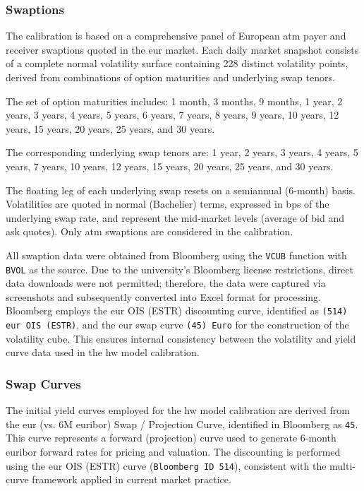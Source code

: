 \subsubsection{Swaptions}
The calibration is based on a comprehensive panel of European \ac{atm} payer and receiver swaptions quoted in the \ac{eur} market. Each daily market snapshot consists of a complete normal volatility surface containing 228 distinct volatility points, derived from combinations of option maturities and underlying swap tenors.

The set of option maturities includes:
1 month, 3 months, 9 months, 1 year, 2 years, 3 years, 4 years, 5 years, 6 years, 7 years, 8 years, 9 years, 10 years, 12 years, 15 years, 20 years, 25 years, and 30 years.

The corresponding underlying swap tenors are:
1 year, 2 years, 3 years, 4 years, 5 years, 7 years, 10 years, 12 years, 15 years, 20 years, 25 years, and 30 years.

The floating leg of each underlying swap resets on a semiannual (6-month) basis. Volatilities are quoted in normal (Bachelier) terms, expressed in \ac{bps} of the underlying swap rate, and represent the mid-market levels (average of bid and ask quotes). Only \ac{atm} swaptions are considered in the calibration.

All swaption data were obtained from Bloomberg using the \texttt{VCUB} function with \texttt{BVOL} as the source. Due to the university's Bloomberg license restrictions, direct data downloads were not permitted; therefore, the data were captured via screenshots and subsequently converted into Excel format for processing. Bloomberg employs the \ac{eur} OIS (ESTR) discounting curve, identified as \texttt{(514) \ac{eur} OIS (ESTR)}, and the \ac{eur} swap curve \texttt{(45) Euro} for the construction of the volatility cube. This ensures internal consistency between the volatility and yield curve data used in the \ac{hw} model calibration.

\subsubsection{Swap Curves}
The initial yield curves employed for the \ac{hw} model calibration are derived from the \ac{eur} (vs. 6M \ac{euribor}) Swap / Projection Curve, identified in Bloomberg as \texttt{45}. This curve represents a forward (projection) curve used to generate 6-month \ac{euribor} forward rates for pricing and valuation. The discounting is performed using the \ac{eur} OIS (ESTR) curve (\texttt{Bloomberg ID 514}), consistent with the multi-curve framework applied in current market practice.

